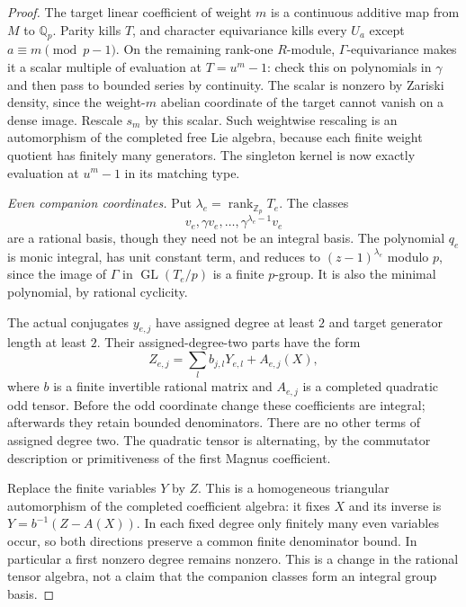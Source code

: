 \begin{proof}
The target linear coefficient of weight $m$ is a continuous additive
map from $M$ to $\mathbb Q_p$. Parity kills $T$, and character
equivariance kills every $U_a$ except $a\equiv m\pmod{p-1}$.
On the remaining rank-one $R$-module, $\Gamma$-equivariance makes
it a scalar multiple of evaluation at $T=u^m-1$: check this on
polynomials in $\gamma$ and then pass to bounded series by
continuity. The scalar is nonzero by Zariski density, since the
weight-$m$ abelian coordinate of the target cannot vanish on a
dense image. Rescale $s_m$ by this scalar. Such weightwise rescaling
is an automorphism of the completed free Lie algebra, because each
finite weight quotient has finitely many generators. The singleton
kernel is now exactly evaluation at $u^m-1$ in its matching type.

\emph{Even companion coordinates.}
Put $\lambda_e=\operatorname{rank}_{\mathbb Z_p}T_e$. The classes
\[
 v_e,\gamma v_e,\ldots,\gamma^{\lambda_e-1}v_e
\]
are a rational basis, though they need not be an integral basis.
The polynomial $q_e$ is monic integral, has unit constant term,
and reduces to $(z-1)^{\lambda_e}$ modulo $p$, since the image of
$\Gamma$ in $\operatorname{GL}(T_e/p)$ is a finite $p$-group.
It is also the minimal polynomial, by rational cyclicity.

The actual conjugates $y_{e,j}$ have assigned degree at least $2$
and target generator length at least $2$. Their assigned-degree-two
parts have the form
\[
 Z_{e,j}=\sum_l b_{j,l}Y_{e,l}+A_{e,j}(X),                    \tag{GM.3}
\]
where $b$ is a finite invertible rational matrix and $A_{e,j}$ is
a completed quadratic odd tensor. Before the odd coordinate change
these coefficients are integral; afterwards they retain bounded
denominators. There are no other terms of assigned degree two.
The quadratic tensor is alternating, by the commutator description
or primitiveness of the first Magnus coefficient.

Replace the finite variables $Y$ by $Z$. This is a homogeneous
triangular automorphism of the completed coefficient algebra:
it fixes $X$ and its inverse is $Y=b^{-1}(Z-A(X))$.
In each fixed degree only finitely many even variables occur,
so both directions preserve a common finite denominator bound.
In particular a first nonzero degree remains nonzero.
This is a change in the rational tensor algebra, not a claim that
the companion classes form an integral group basis.


\end{proof}

